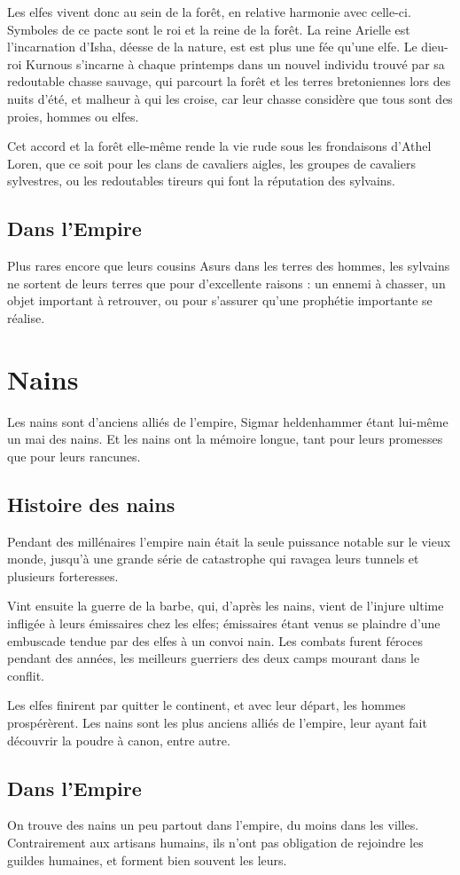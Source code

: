 \documentclass[10pt,a4paper]{book}
\begin{document}
Les elfes vivent donc au sein de la forêt, en relative harmonie avec celle-ci. Symboles de ce pacte sont le roi et la reine de la forêt. La reine Arielle est l'incarnation d'Isha, déesse de la nature, est est plus une fée qu'une elfe. Le dieu-roi Kurnous s'incarne à chaque printemps dans un nouvel individu trouvé par sa redoutable chasse sauvage, qui parcourt la forêt et les terres bretoniennes lors des nuits d'été, et malheur à qui les croise, car leur chasse considère que tous sont des proies, hommes ou elfes.

Cet accord et la forêt elle-même rende la vie rude sous les frondaisons d'Athel Loren, que ce soit pour les clans de cavaliers aigles, les groupes de cavaliers sylvestres, ou les redoutables tireurs qui font la réputation des sylvains.
\section{Dans l'Empire}
Plus rares encore que leurs cousins Asurs dans les terres des hommes, les sylvains ne sortent de leurs terres que pour d'excellente raisons : un ennemi à chasser, un objet important à retrouver, ou pour s'assurer qu'une prophétie importante se réalise.
\chapter{Nains}
Les nains sont d'anciens alliés de l'empire, Sigmar heldenhammer étant lui-même un mai des nains. Et les nains ont la mémoire longue, tant pour leurs promesses que pour leurs rancunes.
\section{Histoire des nains}
Pendant des millénaires l'empire nain était la seule puissance notable sur le vieux monde, jusqu'à une grande série de catastrophe qui ravagea leurs tunnels et plusieurs forteresses. 

Vint ensuite la guerre de la barbe, qui, d'après les nains, vient de l'injure ultime infligée à leurs émissaires chez les elfes; émissaires étant venus se plaindre d'une embuscade tendue par des elfes à un convoi nain. Les combats furent féroces pendant des années, les meilleurs guerriers des deux camps mourant dans le conflit.

Les elfes finirent par quitter le continent, et avec leur départ, les hommes prospérèrent. Les nains sont les plus anciens alliés de l'empire, leur ayant fait découvrir la poudre à canon, entre autre.
\section{Dans l'Empire}
On trouve des nains un peu partout dans l'empire, du moins dans les villes. Contrairement aux artisans humains, ils n'ont pas obligation de rejoindre les guildes humaines, et forment bien souvent les leurs.
\end{document}

